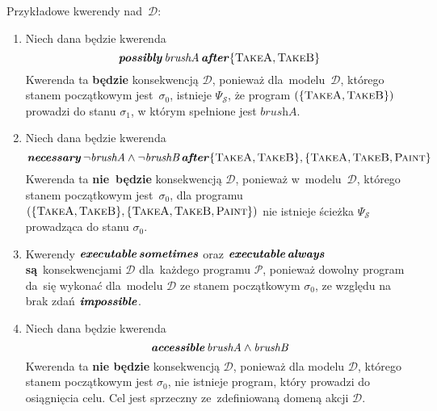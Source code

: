 \documentclass[11pt,a4paper]{article}
\DeclareMathOperator{\After}{\textbf{\textit{after}}}
\DeclareMathOperator{\Impossible}{\textbf{\textit{impossible}}}
\DeclareMathOperator{\Always}{\textbf{\textit{always}}}
\DeclareMathOperator{\Sometimes}{\textbf{\textit{sometimes}}}
\DeclareMathOperator{\Executable}{\textbf{\textit{executable}}}
\DeclareMathOperator{\Accessible}{\textbf{\textit{accessible}}}
\DeclareMathOperator{\Possibly}{\textbf{\textit{possibly}}}
\DeclareMathOperator{\Necessary}{\textbf{\textit{necessary}}}
\begin{document}
Przykładowe kwerendy nad~$\mathcal{D}$:

\begin{enumerate}
    \item Niech dana będzie kwerenda
    $$ \Possibly \textit{brushA} \After \{ \textsc{TakeA} , \textsc{TakeB} \} $$
    Kwerenda ta \textbf{będzie} konsekwencją $\mathcal{D}$, ponieważ dla~modelu~$\mathcal{D}$, którego stanem początkowym jest~$\sigma_0$, istnieje $\Psi_\mathcal{S}$, że program $(\{ \textsc{TakeA} , \textsc{TakeB} \})$ prowadzi do stanu $\sigma_1$, w którym spełnione jest $\textit{brushA}$.

    \item Niech dana będzie kwerenda
    $$ \Necessary \neg \textit{brushA} \land \neg \textit{brushB} \After \{ \textsc{TakeA}, \textsc{TakeB} \}, \{ \textsc{TakeA}, \textsc{TakeB}, \textsc{Paint} \} $$
    Kwerenda ta \textbf{nie~będzie} konsekwencją $\mathcal{D}$, ponieważ w~modelu~$\mathcal{D}$, którego stanem początkowym jest~$\sigma_0$, dla programu $(\{ \textsc{TakeA}, \textsc{TakeB} \}, \{ \textsc{TakeA}, \textsc{TakeB}, \textsc{Paint} \})$ nie istnieje ścieżka $\Psi_\mathcal{S}$ prowadząca do stanu $\sigma_0$.

    \item Kwerendy $\Executable \Sometimes$ oraz $\Executable \Always$ \textbf{są}~konsekwencjami $\mathcal{D}$ dla~każdego programu $\mathcal{P}$, ponieważ dowolny program da~się wykonać dla~modelu $\mathcal{D}$ ze stanem początkowym $\sigma_0$, ze względu na brak zdań $\Impossible$.

    \item Niech dana będzie kwerenda
    $$ \Accessible  \textit{brushA} \land \textit{brushB} $$
    Kwerenda ta \textbf{nie będzie} konsekwencją $\mathcal{D}$, ponieważ dla modelu $\mathcal{D}$, którego stanem początkowym jest $\sigma_0$, nie istnieje program, który prowadzi do osiągnięcia celu. Cel jest sprzeczny ze~zdefiniowaną domeną akcji $\mathcal{D}$.
\end{enumerate}
\end{document}
